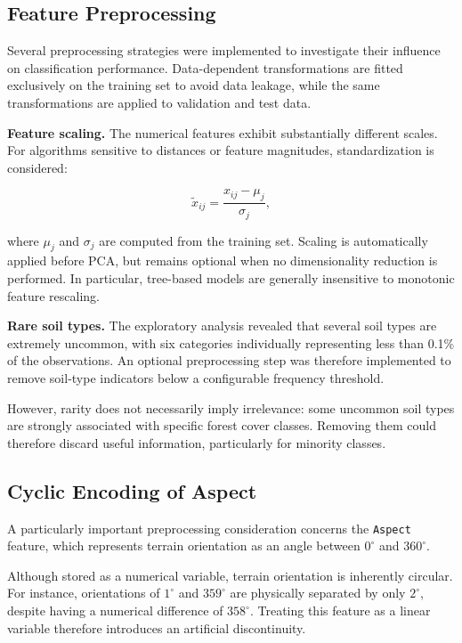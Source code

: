 \documentclass[10pt,a4paper]{article}
\begin{document}
\subsection{Feature Preprocessing}

Several preprocessing strategies were implemented to investigate
their influence on classification performance. Data-dependent
transformations are fitted exclusively on the training set to
avoid data leakage, while the same transformations are applied
to validation and test data.

\textbf{Feature scaling.}
The numerical features exhibit substantially different scales.
For algorithms sensitive to distances or feature magnitudes,
standardization is considered:

\begin{equation}
\widetilde{x}_{ij} =
\frac{x_{ij}-\mu_j}{\sigma_j},
\end{equation}

where $\mu_j$ and $\sigma_j$ are computed from the training set.
Scaling is automatically applied before PCA, but remains optional
when no dimensionality reduction is performed. In particular,
tree-based models are generally insensitive to monotonic feature
rescaling.

\textbf{Rare soil types.}
The exploratory analysis revealed that several soil types are
extremely uncommon, with six categories individually representing
less than 0.1\% of the observations. An optional preprocessing
step was therefore implemented to remove soil-type indicators
below a configurable frequency threshold.

However, rarity does not necessarily imply irrelevance:
some uncommon soil types are strongly associated with specific
forest cover classes. Removing them could therefore discard
useful information, particularly for minority classes.


\subsection{Cyclic Encoding of Aspect}

A particularly important preprocessing consideration concerns
the \texttt{Aspect} feature, which represents terrain orientation
as an angle between $0^\circ$ and $360^\circ$.

Although stored as a numerical variable, terrain orientation
is inherently circular. For instance, orientations of
$1^\circ$ and $359^\circ$ are physically separated by only
$2^\circ$, despite having a numerical difference of $358^\circ$.
Treating this feature as a linear variable therefore introduces
an artificial discontinuity.
\end{document}

